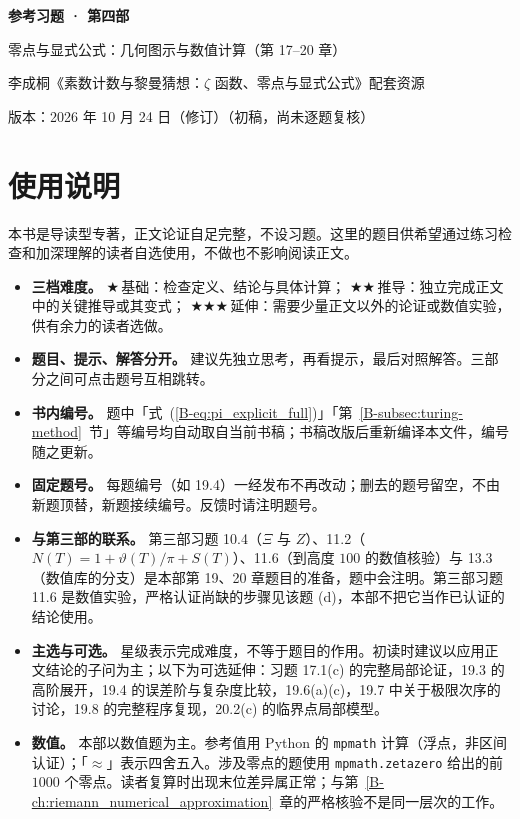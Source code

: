 \documentclass[11pt,a4paper]{article}
\newcommand{\bref}[1]{\ref*{B-#1}}
\newcommand{\lvI}{$\bigstar$\,基础}
\newcommand{\lvII}{$\bigstar\bigstar$\,推导}
\newcommand{\lvIII}{$\bigstar\bigstar\bigstar$\,延伸}
\newcommand{\versiondate}{2026 年 10 月 24 日（修订）}
\begin{document}
\begin{center}
{\LARGE\bfseries 参考习题 · 第四部\par}
\vspace{0.6em}
{\large 零点与显式公式：几何图示与数值计算（第 17–20 章）\par}
\vspace{0.6em}
{\normalsize 李成桐《素数计数与黎曼猜想：$\zeta$ 函数、零点与显式公式》配套资源\par}
\vspace{0.3em}
{\small 版本：\versiondate（初稿，尚未逐题复核）\par}
\end{center}

\vspace{0.8em}
\section*{使用说明}

本书是导读型专著，正文论证自足完整，不设习题。这里的题目供希望通过练习检查和加深理解的读者自选使用，不做也不影响阅读正文。

\begin{itemize}
  \item \textbf{三档难度。}
    \lvI：检查定义、结论与具体计算；
    \lvII：独立完成正文中的关键推导或其变式；
    \lvIII：需要少量正文以外的论证或数值实验，供有余力的读者选做。
  \item \textbf{题目、提示、解答分开。}
    建议先独立思考，再看提示，最后对照解答。三部分之间可点击题号互相跳转。
  \item \textbf{书内编号。}
    题中「式~(\bref{eq:pi_explicit_full})」「第~\bref{subsec:turing-method}~节」等编号均自动取自当前书稿；书稿改版后重新编译本文件，编号随之更新。
  \item \textbf{固定题号。}
    每题编号（如 19.4）一经发布不再改动；删去的题号留空，不由新题顶替，新题接续编号。反馈时请注明题号。
  \item \textbf{与第三部的联系。}
    第三部习题 10.4（$\Xi$ 与 $Z$）、11.2（$N(T)=1+\vartheta(T)/\pi+S(T)$）、11.6（到高度 $100$ 的数值核验）与 13.3（数值库的分支）是本部第 19、20 章题目的准备，题中会注明。第三部习题 11.6 是数值实验，严格认证尚缺的步骤见该题 (d)，本部不把它当作已认证的结论使用。
  \item \textbf{主选与可选。}
    星级表示完成难度，不等于题目的作用。初读时建议以应用正文结论的子问为主；以下为可选延伸：习题 17.1(c) 的完整局部论证，19.3 的高阶展开，19.4 的误差阶与复杂度比较，19.6(a)(c)，19.7 中关于极限次序的讨论，19.8 的完整程序复现，20.2(c) 的临界点局部模型。
  \item \textbf{数值。}
    本部以数值题为主。参考值用 Python 的 \texttt{mpmath} 计算（浮点，非区间认证）；「$\approx$」表示四舍五入。涉及零点的题使用 \texttt{mpmath.zetazero} 给出的前 $1000$ 个零点。读者复算时出现末位差异属正常；与第~\bref{ch:riemann_numerical_approximation}~章的严格核验不是同一层次的工作。
\end{itemize}
\end{document}
